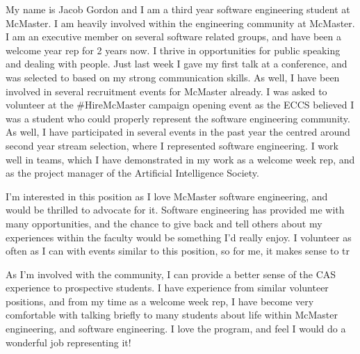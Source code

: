 \documentclass[11pt, letterpaper]{awesome-cv}
\begin{document}
\makecvheader[R]


\makelettertitle

\begin{cvletter}

My name is Jacob Gordon and I am a third year software engineering student at McMaster. I am heavily
involved within the engineering community at McMaster. I am an executive member on several software related groups,
and have been a welcome year rep for 2 years now. I thrive in opportunities for public speaking and dealing with people.
Just last week I gave my first talk at a conference, and was selected to based on my strong communication skills.
As well, I have been involved in several recruitment events for McMaster already. I was asked to volunteer at the #HireMcMaster 
campaign opening event as the ECCS believed I was a student who could properly represent the software engineering community.
As well, I have participated in several events in the past year the centred around second year stream selection, 
where I represented software engineering. I work well in teams, which I have demonstrated in my work as a welcome week rep,
and as the project manager of the Artificial Intelligence Society. 

I'm interested in this position as I love McMaster software engineering, and would be thrilled to advocate for it. 
Software engineering has provided me with many opportunities, and the chance to give back and tell others about my experiences 
within the faculty would be something I'd really enjoy. I volunteer as often as I can with events similar to this position, so
for me, it makes sense to tr


As I'm involved with the community, I can provide a better sense of the CAS experience to prospective students.
I have experience from similar volunteer positions, and from my time as a welcome week rep, I have become very comfortable with 
talking briefly to many students about life within McMaster engineering, and software engineering. I love the program, and feel I would 
do a wonderful job representing it!

\end{cvletter}



\makeletterclosing
\end{document}
